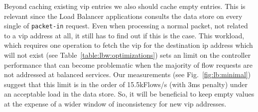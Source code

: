 Beyond caching existing \gls{vip} entries we also should cache empty entries. 
This is relevant since the Load Balancer applications consults the data store on every single \gls{of} \texttt{packet-in} request.
Even when processing a normal packet, not related to a \gls{vip} address at all, it still has to find out if this is the case. 
This workload, which requires one operation to fetch the \gls{vip} for the destination \gls{ip} address which will not exist  (see Table~\ref{table:lbw:optimizations})  sets an limit on the controller performance that can become problematic when the majority of flow requests are not addressed at balanced services. 
Our measurements (see Fig.~\ref{fig:lb:minimal}) suggest that this limit is in the order of 15.5kFlows/s (with 3ms penalty) under an acceptable load in the data store.
So, it will be beneficial to keep empty values at the expense of a wider window of inconsistency for new \gls{vip} addresses. 



